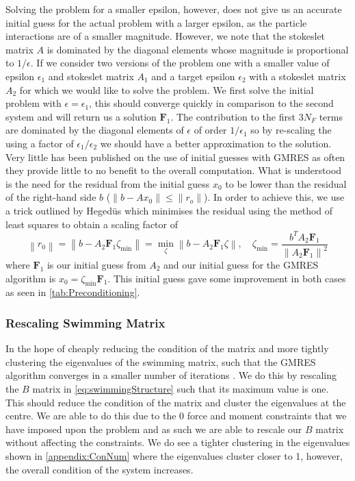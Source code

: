 Solving the problem for a smaller epsilon, however, does not give us an accurate initial guess for the actual problem with a larger epsilon, as the particle interactions are of a smaller magnitude. However, we note that the stokeslet matrix $A$ is dominated by the diagonal elements whose magnitude is proportional to $1/\epsilon$. If we consider two versions of the problem one with a smaller value of epsilon $\epsilon_1$ and stokeslet matrix $A_1$ and a target epsilon $\epsilon_2$ with a stokeslet matrix $A_2$ for which we would like to solve the problem. We first solve the initial problem with $\epsilon=\epsilon_1$, this should converge quickly in comparison to the second system and will return us a solution $\bm{F}_1$. The contribution to the first $3N_{F}$ terms are dominated by the diagonal elements of $\epsilon$ of order $1/\epsilon_1$ so by re-scaling the using a factor of $\epsilon_1/\epsilon_2$ we should have a better approximation to the solution. Very little has been published on the use of initial guesses with GMRES as often they provide little to no benefit to the overall computation. What is understood is the need for the residual from the initial guess $x_0$ to be lower than the residual of the right-hand side $b$ ($\lVert b-Ax_0 \rVert \leq \lVert r_o \rVert$). In order to achieve this, we use a trick outlined by Heged{\"u}s \cite{Saad1986GMRES:Systems,Strakos2005OnComputations} which minimises the residual using the method of least squares to obtain a scaling factor of 
\begin{equation*}
    \left\|r_{0}\right\|=\left\|b-A_2 \bm{F}_1 \zeta_{\min }\right\|=\min _{\zeta}\left\|b-A_2 \bm{F}_1 \zeta\right\|, \quad \zeta_{\min }=\frac{b^{T} A_2 \bm{F}_1}{\left\|A_2 \bm{F}_1\right\|^{2}}
    \label{eq:Hegedus}
\end{equation*}
where $\bm{F}_1$ is our initial guess from $A_2$ and our initial guess for the GMRES algorithm is $x_0 = \zeta_{\min} \bm{F}_1$. This initial guess gave some improvement in both cases as seen in \cref{tab:Preconditioning}.

\subsubsection{Rescaling Swimming Matrix} \label{sec:Rescale}
In the hope of cheaply reducing the condition of the matrix and more tightly clustering the eigenvalues of the swimming matrix, such that the GMRES algorithm converges in a smaller number of iterations \cite{CampbellGMRES}. We do this by rescaling the $B$ matrix in \cref{eq:swimmingStructure} such that its maximum value is one. This should reduce the condition of the matrix and cluster the eigenvalues at the centre. We are able to do this due to the $0$ force and moment constraints that we have imposed upon the problem and as such we are able to rescale our $B$ matrix without affecting the constraints. 
We do see a tighter clustering in the eigenvalues shown in \cref{appendix:ConNum} where the eigenvalues cluster closer to 1, however, the overall condition of the system increases.


